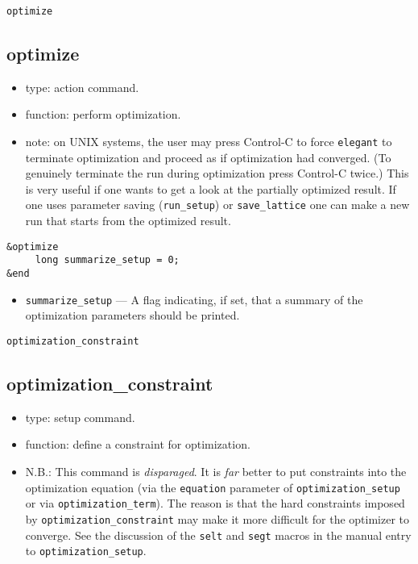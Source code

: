 \documentclass[11pt]{article}
\begin{document}
\begin{latexonly}
\newpage
\begin{center}{\Large\verb|optimize|}\end{center}
\end{latexonly}
\subsection{optimize \label{subsec:optimize}}

\begin{itemize}
\item type: action command.
\item function: perform optimization.
\item note: on UNIX systems, the user may press Control-C to force
\verb|elegant| to terminate optimization and proceed as if
optimization had converged.  (To genuinely terminate the run during
optimization press Control-C twice.) This is very useful if one wants
to get a look at the partially optimized result.  If one uses parameter
saving (\verb|run_setup|) or \verb|save_lattice| one can make a new
run that starts from the optimized result.

\end{itemize}

\begin{verbatim}
&optimize
     long summarize_setup = 0;
&end
\end{verbatim}

\begin{itemize}

\item \verb|summarize_setup| --- A flag indicating, if set, that a
summary of the optimization parameters should be printed.
\end{itemize}

\begin{latexonly}
\newpage
\begin{center}{\Large\verb|optimization_constraint|}\end{center}
\end{latexonly}
\subsection{optimization\_constraint \label{subsec:optimizationconstraint}}

\begin{itemize}
\item type: setup command.
\item function: define a constraint for optimization.
\item N.B.: This command is {\em disparaged}. It is {\em far} better to put constraints
	into the optimization equation (via the \verb|equation| parameter of
	\verb|optimization_setup| or via \verb|optimization_term|).  The reason
	is that the hard constraints imposed by \verb|optimization_constraint|
	may make it more difficult for the optimizer to converge.  See the discussion of the
        \verb|selt| and \verb|segt| macros in the manual entry to \verb|optimization_setup|.
\end{itemize}
\end{document}
